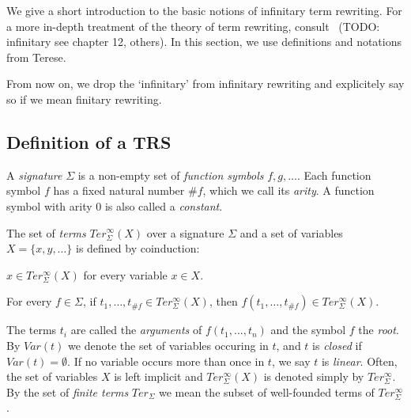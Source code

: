 
We give a short introduction to the basic notions of infinitary term
rewriting. For a more in-depth treatment of the theory of term rewriting,
consult~\cite{terese-03} (TODO: infinitary see chapter 12, others). In this
section, we use definitions and notations from Terese.

From now on, we drop the `infinitary' from infinitary rewriting and
explicitely say so if we mean finitary rewriting.


\subsection{Definition of a TRS}\label{sub:trs}

\begin{definition}%
A \emph{signature} $\Sigma$ is a non-empty set of \emph{function symbols} $f,
g, \ldots$. Each function symbol $f$ has a fixed natural number $\#f$, which
we call its \emph{arity}. A function symbol with arity $0$ is also called a
\emph{constant}.
\end{definition}

\begin{definition}%
The set of \emph{terms} $Ter_\Sigma^\infty(X)$ over a signature $\Sigma$ and a
set of variables $X = \{x, y, \ldots\}$ is defined by coinduction:
\begin{compactenum}
  \item
    $x \in Ter_\Sigma^\infty(X)$ for every variable $x \in X$.
  \item
    For every $f \in \Sigma$, if $t_1, \ldots, t_{\#f} \in
    Ter_\Sigma^\infty(X)$, then $f(t_1, \ldots, t_{\#f}) \in
    Ter_\Sigma^\infty(X)$.
\end{compactenum}
\end{definition}

The terms $t_i$ are called the \emph{arguments} of $f(t_1, \ldots, t_n)$ and
the symbol $f$ the \emph{root}. By $Var(t)$ we denote the set of variables
occuring in $t$, and $t$ is \emph{closed} if $Var(t) = \emptyset$. If no
variable occurs more than once in $t$, we say $t$ is \emph{linear}.
Often, the set of variables $X$ is left implicit and $Ter_\Sigma^\infty(X)$ is
denoted simply by $Ter_\Sigma^\infty$. By the set of \emph{finite terms}
$Ter_\Sigma$ we mean the subset of well-founded terms of $Ter_\Sigma^\infty$.

